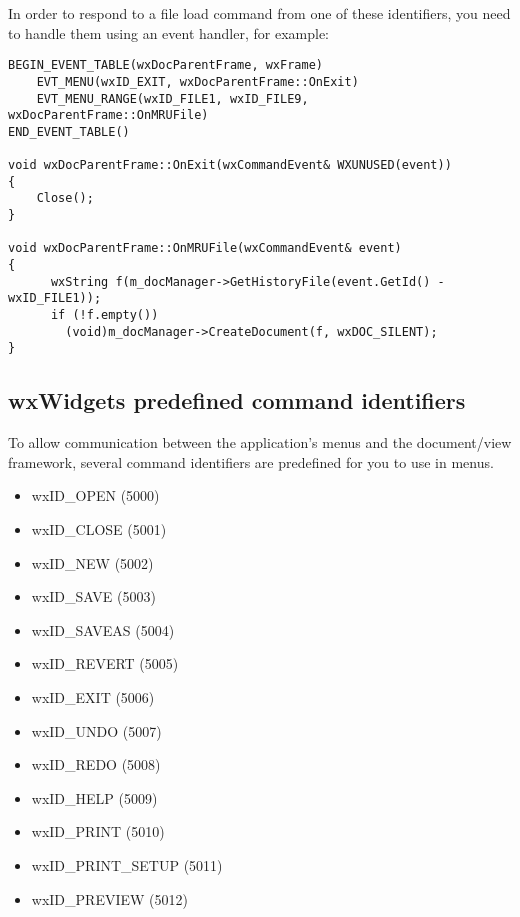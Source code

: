 In order to respond to a file load command from one of these identifiers,
you need to handle them using an event handler, for example:

{\small
\begin{verbatim}
BEGIN_EVENT_TABLE(wxDocParentFrame, wxFrame)
    EVT_MENU(wxID_EXIT, wxDocParentFrame::OnExit)
    EVT_MENU_RANGE(wxID_FILE1, wxID_FILE9, wxDocParentFrame::OnMRUFile)
END_EVENT_TABLE()

void wxDocParentFrame::OnExit(wxCommandEvent& WXUNUSED(event))
{
    Close();
}

void wxDocParentFrame::OnMRUFile(wxCommandEvent& event)
{
      wxString f(m_docManager->GetHistoryFile(event.GetId() - wxID_FILE1));
      if (!f.empty())
        (void)m_docManager->CreateDocument(f, wxDOC_SILENT);
}
\end{verbatim}
}

\subsection{wxWidgets predefined command identifiers}\label{predefinedids}

To allow communication between the application's menus and the
document/view framework, several command identifiers are predefined for you
to use in menus.

\begin{itemize}\itemsep=0pt
\item wxID\_OPEN (5000)
\item wxID\_CLOSE (5001)
\item wxID\_NEW (5002)
\item wxID\_SAVE (5003)
\item wxID\_SAVEAS (5004)
\item wxID\_REVERT (5005)
\item wxID\_EXIT (5006)
\item wxID\_UNDO (5007)
\item wxID\_REDO (5008)
\item wxID\_HELP (5009)
\item wxID\_PRINT (5010)
\item wxID\_PRINT\_SETUP (5011)
\item wxID\_PREVIEW (5012)
\end{itemize}
